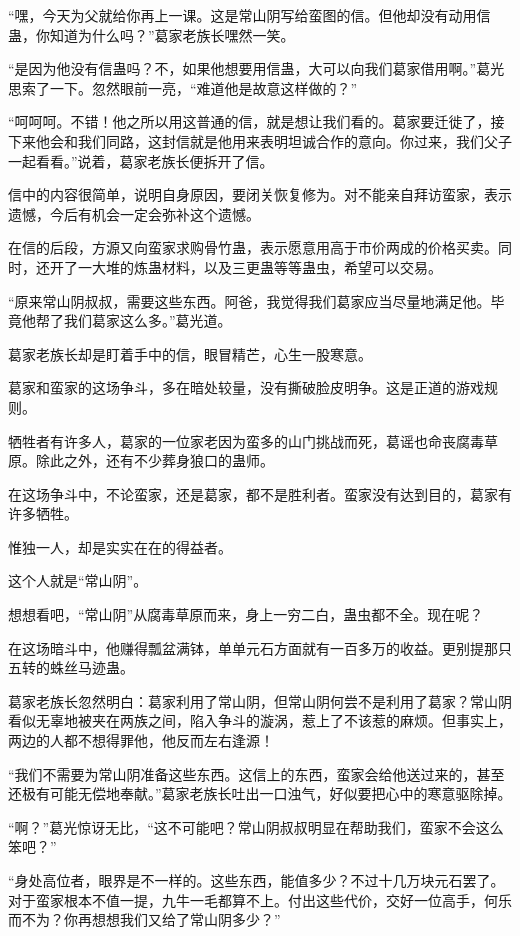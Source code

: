 \begin{this_body}
“嘿，今天为父就给你再上一课。这是常山阴写给蛮图的信。但他却没有动用信蛊，你知道为什么吗？”葛家老族长嘿然一笑。

“是因为他没有信蛊吗？不，如果他想要用信蛊，大可以向我们葛家借用啊。”葛光思索了一下。忽然眼前一亮，“难道他是故意这样做的？”

“呵呵呵。不错！他之所以用这普通的信，就是想让我们看的。葛家要迁徙了，接下来他会和我们同路，这封信就是他用来表明坦诚合作的意向。你过来，我们父子一起看看。”说着，葛家老族长便拆开了信。

信中的内容很简单，说明自身原因，要闭关恢复修为。对不能亲自拜访蛮家，表示遗憾，今后有机会一定会弥补这个遗憾。

在信的后段，方源又向蛮家求购骨竹蛊，表示愿意用高于市价两成的价格买卖。同时，还开了一大堆的炼蛊材料，以及三更蛊等等蛊虫，希望可以交易。

“原来常山阴叔叔，需要这些东西。阿爸，我觉得我们葛家应当尽量地满足他。毕竟他帮了我们葛家这么多。”葛光道。

葛家老族长却是盯着手中的信，眼冒精芒，心生一股寒意。

葛家和蛮家的这场争斗，多在暗处较量，没有撕破脸皮明争。这是正道的游戏规则。

牺牲者有许多人，葛家的一位家老因为蛮多的山门挑战而死，葛谣也命丧腐毒草原。除此之外，还有不少葬身狼口的蛊师。

在这场争斗中，不论蛮家，还是葛家，都不是胜利者。蛮家没有达到目的，葛家有许多牺牲。

惟独一人，却是实实在在的得益者。

这个人就是“常山阴”。

想想看吧，“常山阴”从腐毒草原而来，身上一穷二白，蛊虫都不全。现在呢？

在这场暗斗中，他赚得瓢盆满钵，单单元石方面就有一百多万的收益。更别提那只五转的蛛丝马迹蛊。

葛家老族长忽然明白：葛家利用了常山阴，但常山阴何尝不是利用了葛家？常山阴看似无辜地被夹在两族之间，陷入争斗的漩涡，惹上了不该惹的麻烦。但事实上，两边的人都不想得罪他，他反而左右逢源！

“我们不需要为常山阴准备这些东西。这信上的东西，蛮家会给他送过来的，甚至还极有可能无偿地奉献。”葛家老族长吐出一口浊气，好似要把心中的寒意驱除掉。

“啊？”葛光惊讶无比，“这不可能吧？常山阴叔叔明显在帮助我们，蛮家不会这么笨吧？”

“身处高位者，眼界是不一样的。这些东西，能值多少？不过十几万块元石罢了。对于蛮家根本不值一提，九牛一毛都算不上。付出这些代价，交好一位高手，何乐而不为？你再想想我们又给了常山阴多少？”


\end{this_body}
